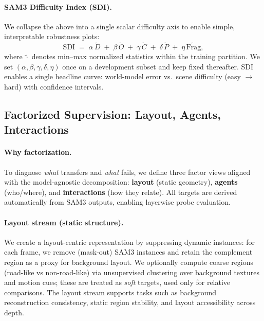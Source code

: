 \paragraph{SAM3 Difficulty Index (SDI).}
We collapse the above into a single scalar difficulty axis to enable simple, interpretable robustness plots:
\begin{equation}
\label{eq:sdi}
\mathrm{SDI} \;=\; \alpha\,\widetilde{D} \;+\; \beta\,\widetilde{O} \;+\; \gamma\,\widetilde{C} \;+\; \delta\,\widetilde{P} \;+\; \eta\,\widetilde{\mathrm{Frag}},
\end{equation}
where $\widetilde{\cdot}$ denotes min--max normalized statistics within the training partition. We set $(\alpha,\beta,\gamma,\delta,\eta)$ once on a development subset and keep fixed thereafter. SDI enables a single headline curve: world-model error vs.\ scene difficulty (easy $\rightarrow$ hard) with confidence intervals.

\subsection{Factorized Supervision: Layout, Agents, Interactions}
\label{sec:indiasuburb5k_factorized}

\paragraph{Why factorization.}
To diagnose \emph{what} transfers and \emph{what} fails, we define three factor views aligned with the model-agnostic decomposition: \textbf{layout} (static geometry), \textbf{agents} (who/where), and \textbf{interactions} (how they relate). All targets are derived automatically from SAM3 outputs, enabling layerwise probe evaluation.

\paragraph{Layout stream (static structure).}
We create a layout-centric representation by suppressing dynamic instances: for each frame, we remove (mask-out) SAM3 instances and retain the complement region as a proxy for background layout. We optionally compute coarse regions (road-like vs non-road-like) via unsupervised clustering over background textures and motion cues; these are treated as \emph{soft} targets, used only for relative comparisons. The layout stream supports tasks such as background reconstruction consistency, static region stability, and layout accessibility across depth.

